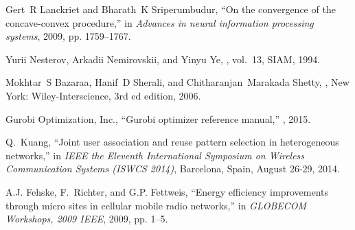 \documentclass{article}
\begin{document}
\begin{thebibliography}{10}
Gert~R Lanckriet and Bharath~K Sriperumbudur,
\newblock ``On the convergence of the concave-convex procedure,''
\newblock in {\em Advances in neural information processing systems}, 2009, pp.
  1759--1767.

Yurii Nesterov, Arkadii Nemirovskii, and Yinyu Ye,
,
  vol.~13,
\newblock SIAM, 1994.

Mokhtar~S Bazaraa, Hanif~D Sherali, and Chitharanjan~Marakada Shetty,
,
\newblock New York: Wiley-Interscience, 3rd ed edition, 2006.

{Gurobi Optimization, Inc.},
\newblock ``Gurobi optimizer reference manual,''
, 2015.

Q.~Kuang,
\newblock ``Joint user association and reuse pattern selection in heterogeneous
  networks,''
\newblock in {\em IEEE the Eleventh International Symposium on Wireless
  Communication Systems (ISWCS 2014)}, Barcelona, Spain, August 26-29, 2014.

A.J. Fehske, F.~Richter, and G.P. Fettweis,
\newblock ``Energy efficiency improvements through micro sites in cellular
  mobile radio networks,''
\newblock in {\em GLOBECOM Workshops, 2009 IEEE}, 2009, pp. 1--5.

\end{thebibliography}
\end{document}

